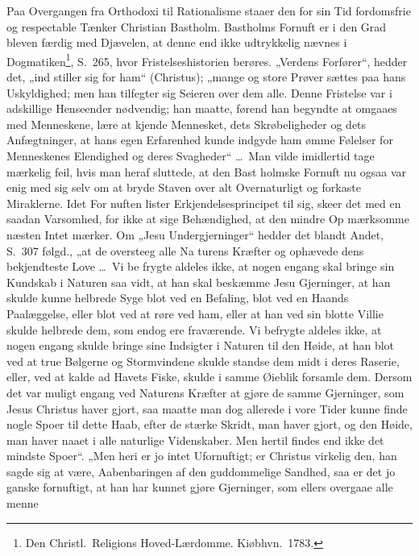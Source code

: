 \documentclass[12pt,a4paper]{article}
\newcommand{\opage}[1]{\marginnote{\footnotesize\textit{[#1]}}}
\begin{document}
Paa Overgangen fra Orthodoxi til Rationalisme staaer den for
sin Tid fordomsfrie og respectable Tænker Christian Bastholm.
Bastholms Fornuft er i den Grad bleven færdig med Djævelen, at
denne end ikke udtrykkelig nævnes i Dogmatiken\footnote{Den Christl.\ Religions Hoved-Lærdomme. Kiøbhvn.\ 1783.}, %
S.\ 265, hvor
Fristelseshistorien berøres. „Verdens Forfører“, hedder det, „ind\-%
stiller sig for ham“ (Christus); „mange og store Prøver sættes
paa hans Uskyldighed; men han tilfegter sig Seieren over dem
alle. Denne Fristelse var i adskillige Henseender nødvendig; han
maatte, førend han begyndte at omgaaes med Menneskene, lære at
kjende Mennesket, dets Skrøbeligheder og dets Anfægtninger, at
hans egen Erfarenhed kunde indgyde ham ømme Følelser for
Menneskenes Elendighed og deres Svagheder“ \ldots\ Man vilde
imidlertid tage mærkelig feil, hvis man heraf sluttede, at den Bast\-%
holmske Fornuft nu ogsaa var enig med sig selv om at bryde
Staven over alt Overnaturligt og forkaste Miraklerne. Idet For\-%
\opage{27}nuften lister Erkjendelsesprincipet til sig, skeer det med en saadan
Varsomhed, for ikke at sige Behændighed, at den mindre Op\-%
mærksomme næsten Intet mærker. Om „Jesu Undergjerninger“
hedder det blandt Andet, S.\ 307 følgd., „at de oversteeg alle Na\-%
turens Kræfter og ophævede dens bekjendteste Love \ldots\ Vi be\-%
frygte aldeles ikke, at nogen engang skal bringe sin Kundskab i
Naturen saa vidt, at han skal beskæmme Jesu Gjerninger, at han
skulde kunne helbrede Syge blot ved en Befaling, blot ved en Haands
Paalæggelse, eller blot ved at røre ved ham, eller at han ved sin
blotte Villie skulde helbrede dem, som endog ere fraværende. Vi
befrygte aldeles ikke, at nogen engang skulde bringe sine Indsigter
i Naturen til den Høide, at han blot ved at true Bølgerne og
Stormvindene skulde standse dem midt i deres Raserie, eller, ved
at kalde ad Havets Fiske, skulde i samme Øieblik forsamle dem.
Dersom det var muligt engang ved Naturens Kræfter at gjøre de
samme Gjerninger, som Jesus Christus haver gjort, saa maatte
man dog allerede i vore Tider kunne finde nogle Spoer til dette
Haab, efter de stærke Skridt, man haver gjort, og den Høide, man
haver naaet i alle naturlige Videnskaber. Men hertil findes end
ikke det mindste Spoer“. „Men heri er jo intet Ufornuftigt; er
Christus virkelig den, han sagde sig at være, Aabenbaringen af
den guddommelige Sandhed, saa er det jo ganske fornuftigt, at
han har kunnet gjøre Gjerninger, som ellers overgaae alle menne\-%
\end{document}
